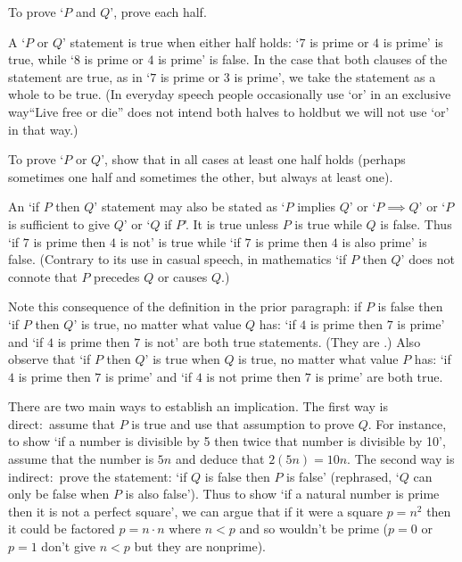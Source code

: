To prove `\( P \) and \( Q \)', prove each half.




A `\( P \) or \( Q \)' statement is true when either half holds:
`\( 7 \) is prime or \( 4 \) is prime' is true, while `\( 8 \) is prime
or \( 4 \) is prime' is false.
In the case that both clauses of the statement are true, 
as in `\( 7 \) is prime or \( 3 \) is prime',
we take the statement as a whole to be true.
(In everyday speech people occasionally use `or' in an 
exclusive way\Dash ``Live
free or die'' does not intend both halves to hold\Dash but
we will not use `or' in that way.)

To prove `\( P \) or \( Q \)', show that in all cases at least one
half holds (perhaps sometimes one half and sometimes the other,
but always at least one).



An `if \( P \) then \( Q \)' statement may also be stated as
`\( P \) implies \( Q \)' or `\( P\implies Q\)' or 
`\( P \) is sufficient to give \( Q \)' or `$Q$ if $P$'.
It 
is true unless \( P \) is true while \( Q \) is false.
Thus `if \( 7 \) is prime then \( 4 \) is not' is true 
while `if \( 7 \) is prime then \( 4 \) is also prime' is false.
(Contrary to its
use in casual speech, in mathematics `if \( P \) then \( Q \)' 
does not connote that
\( P \) precedes \( Q \) or causes \( Q \).)

Note this consequence of the definition in the prior paragraph: 
if $P$ is false then `if \( P \) then \( Q \)' is
true, no matter what value $Q$ has:
`if \( 4 \) is prime then \( 7 \) is prime' and
`if \( 4 \) is prime then \( 7 \) is not' are both true statements.
(They are .)
Also observe that `if \( P \) then \( Q \)' is true when $Q$ is true, no matter 
what value $P$ has: `if $4$ is prime then $7$ is prime' and 
`if $4$ is not prime then $7$ is prime' are both true.


There are two main ways to establish an implication.
The first way is direct:~assume that \( P \) is true and use that
assumption to prove \( Q \).
For instance,
to show `if a number is divisible by 5 then twice that
number is divisible by 10', assume that the number is \( 5n \) and
deduce that \( 2(5n)=10n \).
The second way is indirect:~prove the 
statement: `if \( Q \) is false then \( P \) is false'
(rephrased, `\( Q \) can only be false when \( P \) is also false').
Thus to show `if a natural number is prime then it
is not a perfect square', we can 
argue that if it were a square \( p=n^2 \) then it could be
factored \( p=n\cdot n \) where \( n<p \) and so wouldn't be prime
(\( p=0 \) or \( p=1 \) don't give \( n<p \) but they
are nonprime).

